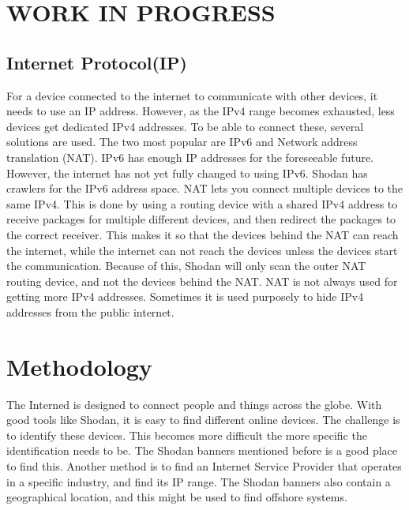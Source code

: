 \section{WORK IN PROGRESS} \label{sec:new}

\subsection{Internet Protocol(IP)}
For a device connected to the internet to communicate with other devices, it needs to use an IP address. However, as the IPv4 range becomes exhausted, less devices get dedicated IPv4 addresses. To be able to connect these, several solutions are used. The two most popular are IPv6 and Network address translation (NAT).
IPv6 has enough IP addresses for the foreseeable future. However, the internet has not yet fully changed to using IPv6. Shodan has crawlers for the IPv6 address space.
NAT lets you connect multiple devices to the same IPv4. This is done by using a routing device with a shared IPv4 address to receive packages for multiple different devices, and then redirect the packages to the correct receiver. This makes it so that the devices behind the NAT can reach the internet, while the internet can not reach the devices unless the devices start the communication. Because of this, Shodan will only scan the outer NAT routing device, and not the devices behind the NAT. NAT is not always used for getting more IPv4 addresses. Sometimes it is used purposely to hide IPv4 addresses from the public internet.


\section{Methodology}
The Interned is designed to connect people and things across the globe. With good tools like Shodan, it is easy to find different online devices. The challenge is to identify these devices. This becomes more difficult the more specific the identification needs to be. The Shodan banners mentioned before is a good place to find this. Another method is to find an Internet Service Provider that operates in a specific industry, and find its IP range. The Shodan banners also contain a geographical location, and this might be used to find offshore systems.

